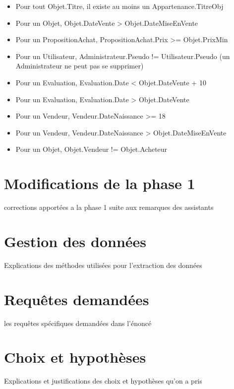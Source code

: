 \documentclass[a4paper,11pt]{article}
\begin{document}
\begin{itemize}
\item Pour tout Objet.Titre, il existe au moins un Appartenance.TitreObj
\item Pour un Objet, Objet.DateVente > Objet.DateMiseEnVente
\item Pour un PropositionAchat, PropositionAchat.Prix >= Objet.PrixMin
\item Pour un Utilisateur, Administrateur.Pseudo != Utilisateur.Pseudo (un Administrateur ne peut pas se supprimer)
\item Pour un Evaluation, Evaluation.Date < Objet.DateVente + 10
\item Pour un Evaluation, Evaluation.Date > Objet.DateVente
\item Pour un Vendeur, Vendeur.DateNaissance >= 18
\item Pour un Vendeur, Vendeur.DateNaissance > Objet.DateMiseEnVente
\item Pour un Objet, Objet.Vendeur != Objet.Acheteur
\end{itemize}


\section{Modifications de la phase 1}

corrections apportées a la phase 1 suite aux remarques des assistants

\section{Gestion des données}

Explications des méthodes utilisées pour l'extraction des données

\section{Requêtes demandées}

les requêtes spécifiques demandées dans l'énoncé

\section{Choix et hypothèses}

Explications et justifications des choix et hypothèses qu'on a pris
\end{document}

